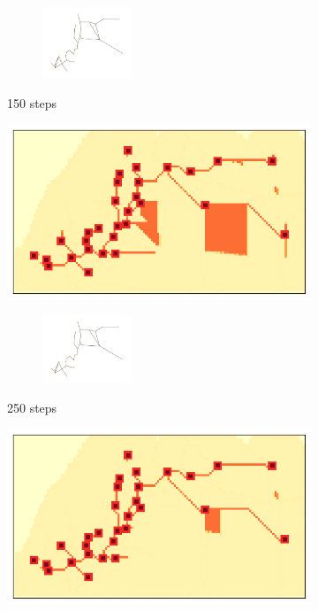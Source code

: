 \documentclass[11pt]{article}
\begin{document}
\begin{figure}[H]
\begin{subfigure}{0.24\textwidth}
	\begin{subfigure}{0.24\textwidth}
	    \centering
	    \hspace*{-1cm}
	    \includegraphics[width=100px]{150graph.png}
	\end{subfigure}
        \caption{150 steps}
    \end{subfigure}\hfill
    \begin{subfigure}{0.24\textwidth}
        \centering
        \includegraphics[width=\linewidth]{250steps.png}
	\begin{subfigure}{0.24\textwidth}
	    \centering
	    \hspace*{-1cm}
	    \includegraphics[width=100px]{250graph.png}
	\end{subfigure}
        \caption{250 steps}
    \end{subfigure}
    \begin{subfigure}{0.24\textwidth}
        \centering
        \includegraphics[width=\linewidth]{350steps.png}

\end{subfigure}
\end{figure}
\end{document}
